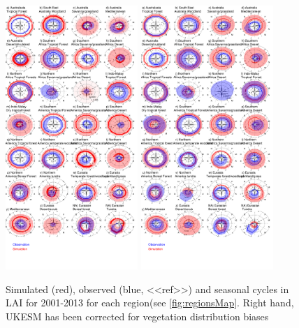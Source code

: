 \documentclass[bg, manuscript]{copernicus}
\begin{document}
\begin{figure}[t]
        \includegraphics[width=5cm]{figs/LAI/fire_var_seasonality-TS-control-lai.png}
        \includegraphics[width=5cm]{figs/LAI/fire_var_seasonality-TS-obsVegDist-lai.png}
    
    \caption{Simulated (red), observed (blue, <<ref>>) and seasonal cycles in LAI for 2001-2013 for each region(see \ref{fig:regionsMap}. Right hand, UKESM has been corrected for vegetation distribution biases \label{fig:LAIseasonalTS}}
\end{figure}
\end{document}
